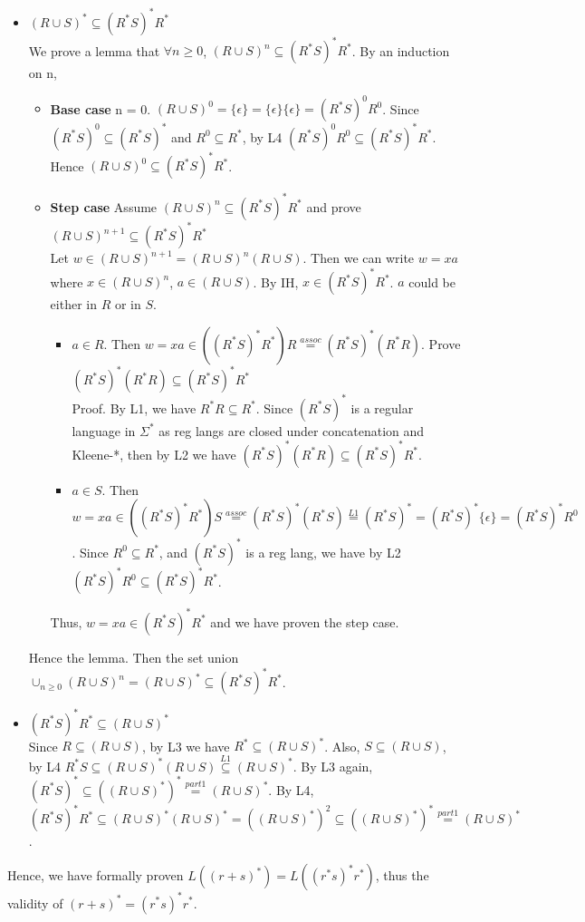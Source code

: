 \documentclass[12pt]{article}
\begin{document}
\begin{itemize}
  \item \((R \cup S)^* \subseteq (R^*S)^*R^*\)\\
  We prove a lemma that \(\forall n \geq 0\), \((R \cup S)^n \subseteq (R^*S)^*R^*\). By an induction on n,
  \begin{itemize}
    \item \textbf{Base case} n = 0. \((R \cup S)^0 = \{\epsilon\} = \{\epsilon\}\{\epsilon\} = (R^*S)^0R^0\). Since \((R^*S)^0 \subseteq (R^*S)^*\) and \(R^0 \subseteq R^*\), by L4 \((R^*S)^0R^0 \subseteq (R^*S)^*R^*\). Hence \((R \cup S)^0 \subseteq (R^*S)^*R^*\).
    \item \textbf{Step case} Assume \((R \cup S)^n \subseteq (R^*S)^*R^*\) and prove \((R \cup S)^{n+1} \subseteq (R^*S)^*R^*\)\\
    Let \(w \in (R \cup S)^{n+1} = (R \cup S)^{n}(R \cup S)\). Then we can write \(w = xa\) where \(x \in (R \cup S)^{n}\), \(a \in (R \cup S)\). By IH, \(x \in (R^*S)^*R^*\). \(a\) could be either in \(R\) or in \(S\).
    \begin{itemize}
      \item \(a \in R\). Then \(w = xa \in ((R^*S)^*R^*)R \overset{assoc}{=} (R^*S)^*(R^*R)\). Prove \((R^*S)^*(R^*R) \subseteq (R^*S)^*R^*\)\\
      Proof. By L1, we have \(R^*R \subseteq R^*\). Since \((R^*S)^*\) is a regular language in \(\Sigma^*\) as reg langs are closed under concatenation and Kleene-*, then by L2 we have \((R^*S)^*(R^*R) \subseteq (R^*S)^*R^*\). 
      \item  \(a \in S\). Then \(w = xa \in ((R^*S)^*R^*)S \overset{assoc}{=} (R^*S)^*(R^*S) \overset{L1}{=} (R^*S)^* = (R^*S)^*\{\epsilon\} = (R^*S)^*R^0\). Since \(R^0 \subseteq R^*\), and \((R^*S)^*\) is a reg lang, we have by L2 \((R^*S)^*R^0 \subseteq (R^*S)^*R^*\).
    \end{itemize}
    Thus, \(w = xa \in (R^*S)^*R^*\) and we have proven the step case.
  \end{itemize}
  Hence the lemma. Then the set union \(\cup_{n \geq 0}(R \cup S)^n = (R \cup S)^* \subseteq (R^*S)^*R^*\).
  \item \((R^*S)^*R^* \subseteq (R \cup S)^*\)\\
  Since \(R \subseteq (R \cup S)\), by L3 we have \(R^* \subseteq (R \cup S)^*\). Also, \(S \subseteq (R \cup S)\), by L4 \(R^*S \subseteq (R \cup S)^*(R \cup S) \overset{L1}{\subseteq} (R \cup S)^*\). By L3 again, \((R^*S)^* \subseteq ((R \cup S)^*)^* \overset{part 1}{=} (R \cup S)^*\). By L4, \((R^*S)^*R^* \subseteq (R \cup S)^*(R \cup S)^* = ((R \cup S)^*)^2 \subseteq ((R \cup S)^*)^* \overset{part 1}{=} (R \cup S)^*\).
\end{itemize}
Hence, we have formally proven \(L((r+s)^*) = L((r^*s)^*r^*)\), thus the validity of \((r+s)^* = (r^*s)^*r^*\).
\end{document}
